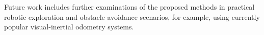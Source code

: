 \documentclass[letterpaper, 10 pt, journal, twoside]{IEEEtran}  %
\begin{document}
Future work includes further examinations of the proposed methods in practical robotic exploration and obstacle avoidance scenarios, for example, using currently popular visual-inertial odometry systems.



% 

 

\end{document}
